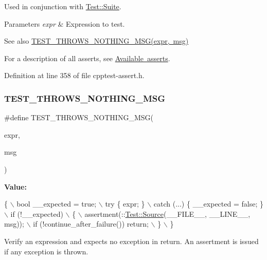 Used in conjunction with \mbox{\hyperlink{class_test_1_1_suite}{Test\+::\+Suite}}.


\begin{DoxyParams}{Parameters}
{\em expr} & Expression to test.\\
\hline
\end{DoxyParams}
\begin{DoxySeeAlso}{See also}
\mbox{\hyperlink{cpptest-assert_8h_a758a47b613522a3d597c513786191ff9}{T\+E\+S\+T\+\_\+\+T\+H\+R\+O\+W\+S\+\_\+\+N\+O\+T\+H\+I\+N\+G\+\_\+\+M\+S\+G(expr, msg)}}
\end{DoxySeeAlso}
For a description of all asserts, see \mbox{\hyperlink{asserts}{Available asserts}}. 

Definition at line 358 of file cpptest-\/assert.\+h.

\mbox{\label{cpptest-assert_8h_a758a47b613522a3d597c513786191ff9}} 
\subsubsection{\texorpdfstring{T\+E\+S\+T\+\_\+\+T\+H\+R\+O\+W\+S\+\_\+\+N\+O\+T\+H\+I\+N\+G\+\_\+\+M\+SG}{TEST\_THROWS\_NOTHING\_MSG}}
{\footnotesize\ttfamily \#define T\+E\+S\+T\+\_\+\+T\+H\+R\+O\+W\+S\+\_\+\+N\+O\+T\+H\+I\+N\+G\+\_\+\+M\+SG(\begin{DoxyParamCaption}\item[{}]{expr,  }\item[{}]{msg }\end{DoxyParamCaption})}

{\bfseries Value\+:}
\begin{DoxyCode}
\{                                                               \(\backslash\)
        bool \_\_expected = \textcolor{keyword}{true};                                     \(\backslash\)
        try \{ expr; \}                                               \(\backslash\)
        catch (...) \{ \_\_expected = \textcolor{keyword}{false}; \}                         \(\backslash\)
        if (!\_\_expected)                                            \(\backslash\)
        \{                                                           \(\backslash\)
            assertment(::\mbox{\hyperlink{class_test_1_1_source}{Test::Source}}(\_\_FILE\_\_, \_\_LINE\_\_, msg));    \(\backslash\)
            if (!continue\_after\_failure()) return;                  \(\backslash\)
        \}                                                           \(\backslash\)
    \}
\end{DoxyCode}
Verify an expression and expects no exception in return. An assertment is issued if any exception is thrown.

